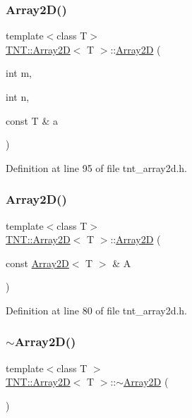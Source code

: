 \subsubsection{\texorpdfstring{Array2\+D()}{Array2D()}\hspace{0.1cm}{\footnotesize\ttfamily [4/5]}}
{\footnotesize\ttfamily template$<$class T$>$ \\
\hyperlink{classTNT_1_1Array2D}{T\+N\+T\+::\+Array2D}$<$ T $>$\+::\hyperlink{classTNT_1_1Array2D}{Array2D} (\begin{DoxyParamCaption}\item[{int}]{m,  }\item[{int}]{n,  }\item[{const T \&}]{a }\end{DoxyParamCaption})}



Definition at line 95 of file tnt\+\_\+array2d.\+h.

\mbox{\label{classTNT_1_1Array2D_a065e795f6f2486ca7ea0bca09200dbd4}} 
\subsubsection{\texorpdfstring{Array2\+D()}{Array2D()}\hspace{0.1cm}{\footnotesize\ttfamily [5/5]}}
{\footnotesize\ttfamily template$<$class T$>$ \\
\hyperlink{classTNT_1_1Array2D}{T\+N\+T\+::\+Array2D}$<$ T $>$\+::\hyperlink{classTNT_1_1Array2D}{Array2D} (\begin{DoxyParamCaption}\item[{const \hyperlink{classTNT_1_1Array2D}{Array2D}$<$ T $>$ \&}]{A }\end{DoxyParamCaption})\hspace{0.3cm}{\ttfamily [inline]}}



Definition at line 80 of file tnt\+\_\+array2d.\+h.

\mbox{\label{classTNT_1_1Array2D_a87c0133fa83755104b75631cfa4d6ab7}} 
\subsubsection{\texorpdfstring{$\sim$\+Array2\+D()}{~Array2D()}}
{\footnotesize\ttfamily template$<$class T $>$ \\
\hyperlink{classTNT_1_1Array2D}{T\+N\+T\+::\+Array2D}$<$ T $>$\+::$\sim$\hyperlink{classTNT_1_1Array2D}{Array2D} (\begin{DoxyParamCaption}{ }\end{DoxyParamCaption})}



